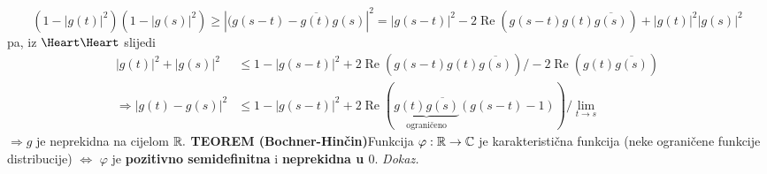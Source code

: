 \documentclass{article}
\newcommand{\myre}{\operatorname{Re}}
\begin{document}
\[\left(1-|g(t)|^2\right)\left(1-|g(s)|^2\right)\ge\left|(g(s-t)-\overline{g(t)}g(s)\right|^2=|g(s-t)|^2-2\myre\left(g(s-t)g(t)\overline{g(s)}\right)+|g(t)|^2|g(s)|^2\] pa, iz \(\text{\Heart}\text{\Heart}\) slijedi \[\begin{aligned}|g(t)|^2+|g(s)|^2&\le 1-|g(s-t)|^2+2\myre\left(g(s-t)g(t)\overline{g(s)}\right)\bigg/-2\myre\left(g(t)\overline{g(s)}\right)\\\Rightarrow\left|g(t)-g(s)\right|^2&\le1-|g(s-t)|^2+2\myre\left(\underbrace{g(t)\overline{g(s)}}_{\text{ograničeno}}(g(s-t)-1)\right)\bigg/\lim_{t\to s}\end{aligned}\] \(\Rightarrow g\) je neprekidna na cijelom \(\Bbb R.\)\newline\newline
\textbf{TEOREM (Bochner-Hinčin)}\newline Funkcija \(\varphi:\Bbb R\to\Bbb C\) je karakteristična funkcija (neke ograničene funkcije distribucije) \(\Leftrightarrow\) \(\varphi\) je \textbf{pozitivno semidefinitna} i \textbf{neprekidna u \(0\)}.\newline\newline
\textit{Dokaz.}
\end{document}
